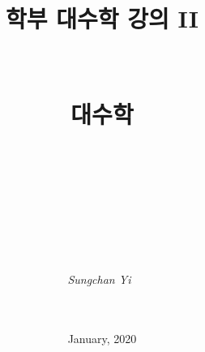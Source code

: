 \documentclass[12pt]{article}
\title{\Large ~\\~\\~\\~\\학부 대수학 강의 II\\~\\~\\ \Huge \bfseries 대수학 \\~\\~\\~\\~\\}
\author{\itshape Sungchan Yi~\\~\\~\\}
\date{January, 2020}
\begin{document}
\maketitle
\pagebreak
\tableofcontents
\pagebreak



\pagebreak~
\end{document}
